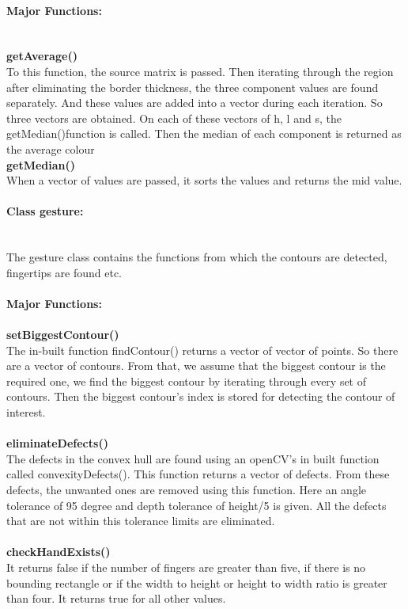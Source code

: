 \documentclass[a4paper,11pt]{article}
\newcommand{\mparagraph}[1]{\paragraph{#1}\mbox{}\\}
\begin{document}
        				\paragraph{Major Functions:\\\\}
        				\textbf{getAverage()\\}
        					To this function, the source matrix is passed. Then iterating through the region after eliminating the border thickness, the three component values are found separately. And these values are added into a vector during each iteration. So three vectors are obtained. On each of these vectors of h, l and s, the getMedian()function is called. Then the median of each component is returned as the average colour\\
        				\textbf{getMedian()\\}
        					When a vector of values are passed, it sorts the values and returns the mid value.
        			\mparagraph{Class gesture:\\}
        				The gesture class contains the functions from which the contours are detected, fingertips are found etc.\\\\
        				\textbf{Major Functions:\\}\\
        				 \textbf{setBiggestContour()\\}
        				 	The in-built function findContour() returns a vector of vector of points. So there are a vector of contours. From that, we assume that the biggest contour is the required one, we find the biggest contour by iterating through every set of contours. Then the biggest contour's index is stored for detecting the contour of interest.\\\\
    					 \textbf{eliminateDefects()\\}
    					 	The defects in the convex hull are found using an openCV's in built function called convexityDefects(). This function returns a vector of defects. From these defects, the unwanted ones are removed using this function. Here an angle tolerance of 95 degree and depth tolerance of height/5 is given. All the defects that are not within this tolerance limits are eliminated.\\
    					 	\\
    					 \textbf{checkHandExists()\\}
    					 	It returns false if the number of fingers are greater than five, if there is no bounding rectangle or if the width to height or height to width ratio is greater than four. It returns true for all other values.\\
\end{document}
